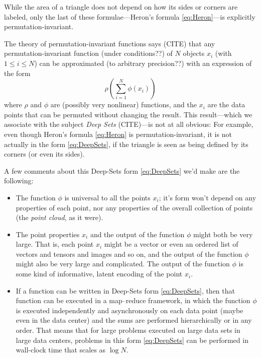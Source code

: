 \documentclass[12pt]{article}
\begin{document}
While the area of a triangle does not depend on how its sides or corners are labeled,
only the last of these formulae---Heron's formula \eqref{eq:Heron}---is explicitly permutation-invariant.

The theory of permutation-invariant functions says (CITE) that any per\-mu\-tation-invariant function (under conditions??) of $N$ objects $x_i$ (with $1\leq i\leq N$) can be approximated (to arbitrary precision??) with an expression of the form
\begin{equation}
    \rho(\sum_{i=1}^N\phi(x_i)) \label{eq:DeepSets}
\end{equation}
where $\rho$ and $\phi$ are (possibly very nonlinear) functions,
and the $x_i$ are the data points that can be permuted without changing the result.
This result---which we associate with the subject \emph{Deep Sets} (CITE)---is not at all obvious:
For example, even though Heron's formula \eqref{eq:Heron} is permutation-invariant, it is not actually in the form \eqref{eq:DeepSets}, if the triangle is seen as being defined by its corners (or even its sides).

A few comments about this Deep-Sets form \eqref{eq:DeepSets} we'd make are the following:
\begin{itemize}
    \item The function $\phi$ is universal to all the points $x_i$; it's form won't depend on any properties of each point, nor any properties of the overall collection of points (the \emph{point cloud}, as it were).
    \item The point properties $x_i$ and the output of the function $\phi$ might both be very large.
    That is, each point $x_i$ might be a vector or even an ordered list of vectors and tensors and images and so on, and the output of the function $\phi$ might also be very large and complicated.
    The output of the function $\phi$ is some kind of informative, latent encoding of the point $x_i$.
    \item If a function can be written in Deep-Sets form \eqref{eq:DeepSets}, then that function can be executed in a map--reduce framework, in which the function $\phi$ is executed independently and asynchronously on each data point (maybe even in the data center) and the sums are performed hierarchically or in any order.
    That means that for large problems executed on large data sets in large data centers, problems in this form \eqref{eq:DeepSets} can be performed in wall-clock time that scales as $\log N$.
\end{itemize}
\end{document}
